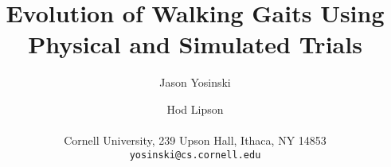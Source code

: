 \documentclass[letterpaper]{article}
\title{Evolution of Walking Gaits Using Physical and Simulated Trials}
\author{Jason Yosinski \and Hod Lipson  \\
  \mbox{}\\
Cornell University, 239 Upson Hall, Ithaca, NY 14853 \\
\texttt{yosinski@cs.cornell.edu}}
\begin{document}
\maketitle

\begin{abstract}

\end{abstract}










\footnotesize


\end{document}
